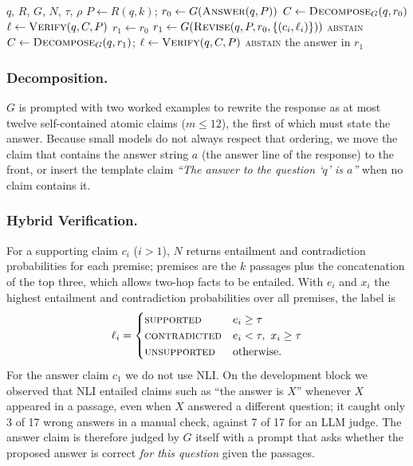 \documentclass{svproc}
\begin{document}
\begin{algorithm}[htb]
\caption{RAG-Verify (one question)}\label{alg:rv}
\begin{algorithmic}[1]
\REQUIRE $q$, $R$, $G$, $N$, $\tau$, $\rho$
\STATE $P \gets R(q,k)$; \quad $r_0 \gets G(\textsc{Answer}(q,P))$
\STATE $C \gets \textsc{Decompose}_G(q,r_0)$ 
\STATE $\ell \gets \textsc{Verify}(q,C,P)$ 
\STATE $r_1 \gets r_0$
  \STATE $r_1 \gets G(\textsc{Revise}(q,P,r_0,\{(c_i,\ell_i)\}))$
    \RETURN \textsc{abstain}
  \ENDIF
  \STATE $C \gets \textsc{Decompose}_G(q,r_1)$; \quad $\ell \gets \textsc{Verify}(q,C,P)$
\ENDIF
{}
  \RETURN \textsc{abstain}
\ENDIF
\RETURN the answer in $r_1$
\end{algorithmic}
\end{algorithm}

\subsubsection{Decomposition.} $G$ is prompted with two worked examples to rewrite the response as at most twelve self-contained atomic claims ($m\le 12$), the first of which must state the answer. Because small models do not always respect that ordering, we move the claim that contains the answer string $a$ (the answer line of the response) to the front, or insert the template claim \emph{``The answer to the question `$q$' is $a$''} when no claim contains it.

\subsubsection{Hybrid Verification.} For a supporting claim $c_i$ ($i>1$), $N$ returns entailment and contradiction probabilities for each premise; premises are the $k$ passages plus the concatenation of the top three, which allows two-hop facts to be entailed. With $e_i$ and $x_i$ the highest entailment and contradiction probabilities over all premises, the label is
\begin{equation}
\ell_i=\begin{cases}\textsc{supported} & e_i\ge\tau\\ \textsc{contradicted} & e_i<\tau,\ x_i\ge\tau\\ \textsc{unsupported} & \text{otherwise.}\end{cases}\label{eq:label}
\end{equation}
For the answer claim $c_1$ we do not use NLI. On the development block we observed that NLI entailed claims such as ``the answer is $X$'' whenever $X$ appeared in a passage, even when $X$ answered a different question; it caught only 3 of 17 wrong answers in a manual check, against 7 of 17 for an LLM judge. The answer claim is therefore judged by $G$ itself with a prompt that asks whether the proposed answer is correct \emph{for this question} given the passages.
\end{document}
